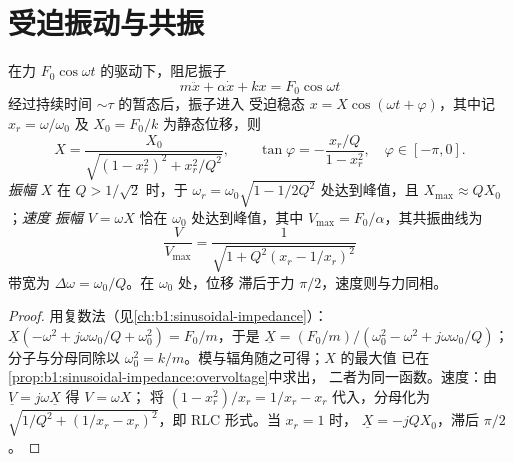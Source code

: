 \section{受迫振动与共振}

\begin{theorem}[正弦驱动振子]\label{thm:b1:oscillators-resonance:forced}
在力 $F_0\cos\omega t$ 的驱动下，阻尼振子
\[
m\ddot x + \alpha\dot x + kx = F_0\cos\omega t
\]
经过持续时间 $\sim\tau$ 的暂态后，振子进入
受迫稳态 $x = X\cos(\omega t + \varphi)$，其中记 $x_r = \omega/\omega_0$
及 $X_0 = F_0/k$ 为静态位移，则
\[
X = \frac{X_0}{\sqrt{(1 - x_r^2)^2 + x_r^2/Q^2}}, \qquad
\tan\varphi = -\frac{x_r/Q}{1 - x_r^2}, \quad \varphi \in [-\pi, 0] .
\]
\emph{振幅} $X$ 在 $Q > 1/\sqrt2$ 时，于 $\omega_r =
\omega_0\sqrt{1 - 1/2Q^2}$ 处达到峰值，且 $X_{\max} \approx QX_0$；\emph{速度
振幅} $V = \omega X$ 恰在 $\omega_0$ 处达到峰值，其中 $V_{\max} =
F_0/\alpha$，其共振曲线为
\[
\frac{V}{V_{\max}} = \frac{1}{\sqrt{1 + Q^2(x_r - 1/x_r)^2}}
\]
带宽为 $\Delta\omega = \omega_0/Q$。在 $\omega_0$ 处，位移
滞后于力 $\pi/2$，速度则与力同相。
\end{theorem}

\begin{proof}
用复数法（见\cref{ch:b1:sinusoidal-impedance}）：$\underline X(-\omega^2
+ j\omega\omega_0/Q + \omega_0^2) = F_0/m$，于是 $\underline X = (F_0/m)/(\omega_0^2
- \omega^2 + j\omega\omega_0/Q)$；分子与分母同除以
$\omega_0^2 = k/m$。模与辐角随之可得；$X$ 的最大值
已在\cref{prop:b1:sinusoidal-impedance:overvoltage}中求出，
二者为同一函数。速度：由 $\underline V = j\omega\underline X$ 得 $V = \omega X$；
将 $(1 - x_r^2)/x_r = 1/x_r - x_r$ 代入，分母化为
$\sqrt{1/Q^2 + (1/x_r - x_r)^2}$，即 RLC 形式。当 $x_r = 1$ 时，
$\underline X = -jQX_0$，滞后 $\pi/2$。
\end{proof}


